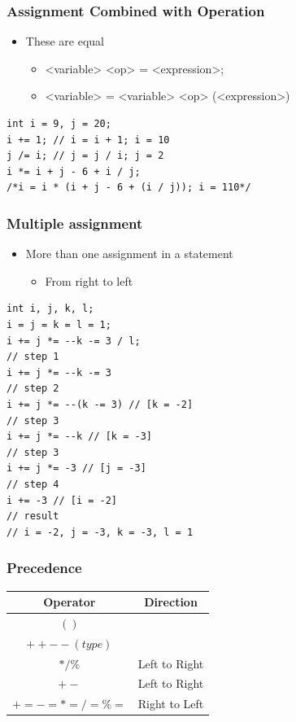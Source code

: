 \documentclass{../c-lecture}
\begin{document}
\begin{frame}[fragile]
  \frametitle{Assignment Combined with Operation}
  \begin{itemize}
    \item These are equal
    \begin{itemize}
      \item <variable> <op> = <expression>;
      \item
        <variable> = <variable> <op> (<expression>)
    \end{itemize}
  \end{itemize}
  \begin{verbatim}
int i = 9, j = 20;
i += 1; // i = i + 1; i = 10
j /= i; // j = j / i; j = 2
i *= i + j - 6 + i / j;
/*i = i * (i + j - 6 + (i / j)); i = 110*/
  \end{verbatim}
\end{frame}

\begin{frame}[fragile]
  \frametitle{Multiple assignment}
  \begin{itemize}
    \item More than one assignment in a statement
    \begin{itemize}
      \item From right to left
    \end{itemize}
  \end{itemize}
  \begin{verbatim}
int i, j, k, l;
i = j = k = l = 1;
i += j *= --k -= 3 / l;
// step 1
i += j *= --k -= 3
// step 2
i += j *= --(k -= 3) // [k = -2]
// step 3
i += j *= --k // [k = -3]
// step 3
i += j *= -3 // [j = -3]
// step 4
i += -3 // [i = -2]
// result
// i = -2, j = -3, k = -3, l = 1
  \end{verbatim}
\end{frame}

\begin{frame}
  \frametitle{Precedence}
  \begin{table}
  \begin{tabular}{cc}
    \toprule

    Operator &
    Direction \\

    \midrule

    $( )$&
    \\

    \midrule

    $++ -- (type)$ &
    \\

    \midrule

    $* / \%$ &
    Left to Right \\

    \midrule

    $+ -$ &
    Left to Right \\

    \midrule

    $+= -= *= /= \%=$ &
    Right to Left \\

    \bottomrule
  \end{tabular}
  \end{table}
\end{frame}
\end{document}
